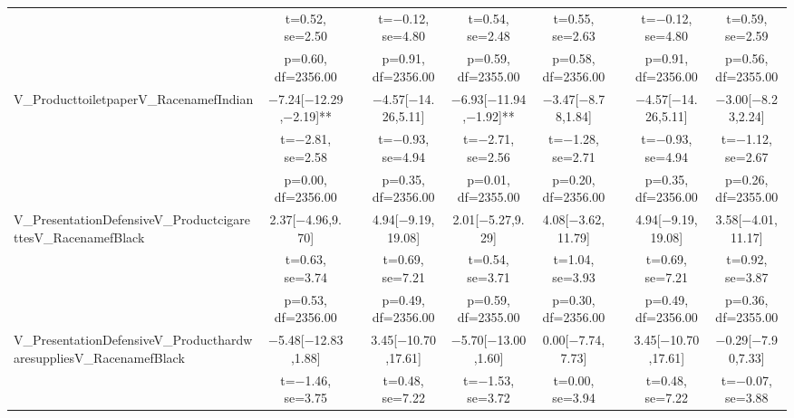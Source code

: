 \documentclass[]{report}
\begin{document}
\begin{table}
{\begin{tabular}[t]{lcccccccc}
		& t=\num{0.52}, se=\num{2.50} &  & t=\num{-0.12}, se=\num{4.80} & t=\num{0.54}, se=\num{2.48} & t=\num{0.55}, se=\num{2.63} &  & t=\num{-0.12}, se=\num{4.80} & t=\num{0.59}, se=\num{2.59}\\
		& p=\num{0.60}, df=\num{2356.00} &  & p=\num{0.91}, df=\num{2356.00} & p=\num{0.59}, df=\num{2355.00} & p=\num{0.58}, df=\num{2356.00} &  & p=\num{0.91}, df=\num{2356.00} & p=\num{0.56}, df=\num{2355.00}\\
		V\_ProducttoiletpaperV\_RacenamefIndian & \num{-7.24}[\num{-12.29},\num{-2.19}]** &  & \num{-4.57}[\num{-14.26},\num{5.11}] & \num{-6.93}[\num{-11.94},\num{-1.92}]** & \num{-3.47}[\num{-8.78},\num{1.84}] &  & \num{-4.57}[\num{-14.26},\num{5.11}] & \num{-3.00}[\num{-8.23},\num{2.24}]\\
		& t=\num{-2.81}, se=\num{2.58} &  & t=\num{-0.93}, se=\num{4.94} & t=\num{-2.71}, se=\num{2.56} & t=\num{-1.28}, se=\num{2.71} &  & t=\num{-0.93}, se=\num{4.94} & t=\num{-1.12}, se=\num{2.67}\\
		& p=\num{0.00}, df=\num{2356.00} &  & p=\num{0.35}, df=\num{2356.00} & p=\num{0.01}, df=\num{2355.00} & p=\num{0.20}, df=\num{2356.00} &  & p=\num{0.35}, df=\num{2356.00} & p=\num{0.26}, df=\num{2355.00}\\
		V\_PresentationDefensiveV\_ProductcigarettesV\_RacenamefBlack & \num{2.37}[\num{-4.96},\num{9.70}] &  & \num{4.94}[\num{-9.19},\num{19.08}] & \num{2.01}[\num{-5.27},\num{9.29}] & \num{4.08}[\num{-3.62},\num{11.79}] &  & \num{4.94}[\num{-9.19},\num{19.08}] & \num{3.58}[\num{-4.01},\num{11.17}]\\
		& t=\num{0.63}, se=\num{3.74} &  & t=\num{0.69}, se=\num{7.21} & t=\num{0.54}, se=\num{3.71} & t=\num{1.04}, se=\num{3.93} &  & t=\num{0.69}, se=\num{7.21} & t=\num{0.92}, se=\num{3.87}\\
		& p=\num{0.53}, df=\num{2356.00} &  & p=\num{0.49}, df=\num{2356.00} & p=\num{0.59}, df=\num{2355.00} & p=\num{0.30}, df=\num{2356.00} &  & p=\num{0.49}, df=\num{2356.00} & p=\num{0.36}, df=\num{2355.00}\\
		V\_PresentationDefensiveV\_ProducthardwaresuppliesV\_RacenamefBlack & \num{-5.48}[\num{-12.83},\num{1.88}] &  & \num{3.45}[\num{-10.70},\num{17.61}] & \num{-5.70}[\num{-13.00},\num{1.60}] & \num{0.00}[\num{-7.74},\num{7.73}] &  & \num{3.45}[\num{-10.70},\num{17.61}] & \num{-0.29}[\num{-7.90},\num{7.33}]\\
		& t=\num{-1.46}, se=\num{3.75} &  & t=\num{0.48}, se=\num{7.22} & t=\num{-1.53}, se=\num{3.72} & t=\num{0.00}, se=\num{3.94} &  & t=\num{0.48}, se=\num{7.22} & t=\num{-0.07}, se=\num{3.88}\\

\end{tabular}}
\end{table}
\end{document}
